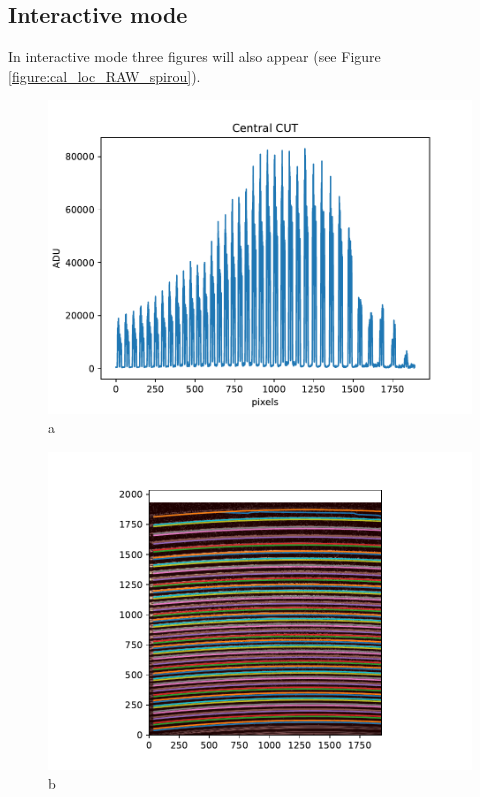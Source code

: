 \newpage
\subsection{Interactive mode}

\noindent In interactive mode three figures will also appear (see Figure \ref{figure:cal_loc_RAW_spirou}).

\begin{figure}

\begin{center}
\begin{minipage}{.495\textwidth}
\begin{center}
\includegraphics[width=\textwidth]{Figures/cal_loc_RAW_spirou_1.pdf}
a
\end{center}
\end{minipage}%
\begin{minipage}{.495\textwidth}
\begin{center}
\includegraphics[width=\textwidth]{Figures/cal_loc_RAW_spirou_2.pdf}
b
\end{center}
\end{minipage}%
\end{center}


\end{figure}
